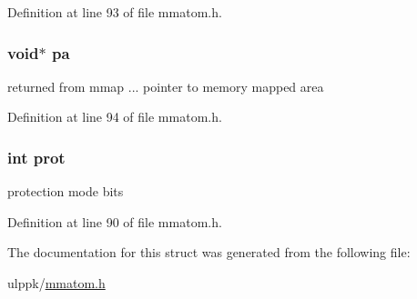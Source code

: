Definition at line 93 of file mmatom.\-h.

\hypertarget{struct_m_m_a___m_e_m_m_a_p___r_e_f_ae642ac0c16c7fa1c32b7612e9734db81}{
\subsubsection[{pa}]{\setlength{\rightskip}{0pt plus 5cm}void$\ast$ pa}}\label{struct_m_m_a___m_e_m_m_a_p___r_e_f_ae642ac0c16c7fa1c32b7612e9734db81}


returned from mmap ... pointer to memory mapped area 



Definition at line 94 of file mmatom.\-h.

\hypertarget{struct_m_m_a___m_e_m_m_a_p___r_e_f_a55eaf976f72b18e313862d8f549a4ef0}{
\subsubsection[{prot}]{\setlength{\rightskip}{0pt plus 5cm}int prot}}\label{struct_m_m_a___m_e_m_m_a_p___r_e_f_a55eaf976f72b18e313862d8f549a4ef0}


protection mode bits 



Definition at line 90 of file mmatom.\-h.



The documentation for this struct was generated from the following file\-:\begin{DoxyCompactItemize}
\item 
ulppk/\hyperlink{mmatom_8h}{mmatom.\-h}\end{DoxyCompactItemize}
